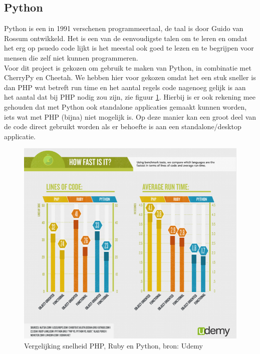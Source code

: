 \documentclass[twoside,openright]{uva-bachelor-thesis}
\begin{document}
			\subsection{Python}
				Python is een in 1991 verschenen programmeertaal, de taal is door Guido van Rossum ontwikkeld. Het is een van de eenvoudigste talen om te leren en omdat het erg op psuedo code lijkt is het meestal ook goed te lezen en te begrijpen voor mensen die zelf niet kunnen programmeren.
				\\[0.5cm]
			Voor dit project is gekozen om gebruik te maken van Python, in combinatie met CherryPy en Cheetah. We hebben hier voor gekozen omdat het een stuk sneller is dan PHP wat betreft run time en het aantal regels code nagenoeg gelijk is aan het aantal dat bij PHP nodig zou zijn, zie figuur \ref{fig:phpvspython2}. Hierbij is er ook rekening mee gehouden dat met Python ook standalone applicaties gemaakt kunnen worden, iets wat met PHP (bijna) niet mogelijk is. Op deze manier kan een groot deel van de code direct gebruikt worden als er behoefte is aan een standalone/desktop applicatie.
			\begin{figure}[!htb]
				\centering
				\includegraphics[scale=0.9]{./img/phpvspython2.png}
				\caption{Vergelijking snelheid PHP, Ruby en Python, bron: Udemy}
				\label{fig:phpvspython2}
			\end{figure}
\end{document}
